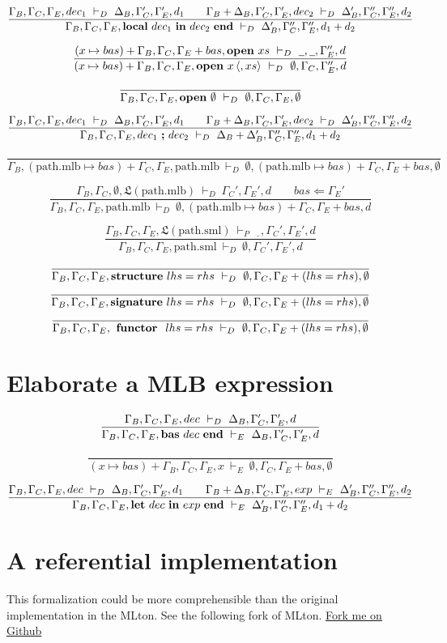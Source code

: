 \documentclass[11pt,a4paper]{article}
\newcommand{\keyword}[1]{\textrm{\textbf{#1}}}
\newcommand{\local}[2]{\keyword{local}\ #1\ \keyword{in}\ #2\ \keyword{end}}
\newcommand{\open}[1]{\keyword{open}\ #1}
\newcommand{\sequence}[2]{#1\ \keyword{;}\ #2}
\newcommand{\pathmlb}{\textrm{path.mlb}}
\newcommand{\pathsml}{\textrm{path.sml}}
\newcommand{\structure}{\keyword{structure}\ }
\newcommand{\signature}{\keyword{signature}\ }
\newcommand{\functor}  {\keyword{\ functor\ }\ }
\newcommand{\bas}[1]{\keyword{bas}\ #1\ \keyword{end}}
\newcommand{\lete}[2]{\keyword{let}\ #1\ \keyword{in}\ #2\ \keyword{end}}
\newcommand{\load}[1]{\mathfrak{L}(#1)}
\newcommand{\makebasis}[2]{ #1 \Leftarrow #2 }
\newcommand{\Binds}{\Gamma_B}
\newcommand{\BndAD}{\Delta_B}
\newcommand{\Cache}{\Gamma_C}
\newcommand{\Elabo}{\Gamma_E}
\newcommand{\Empty}{\emptyset}
\newcommand{\optional}[1]{\langle #1 \rangle}
\newcommand{\ElabDec}{\ \vdash_D\ }
\newcommand{\ElabExp}{\ \vdash_E\ }
\newcommand{\ElabProg}{\ \vdash_P\ }
\newcommand{\wildcard}{\underline{\phantom{2}}}
\begin{document}
\[
\dfrac{\Binds,\Cache,\Elabo,dec_1 \ElabDec \BndAD,\Cache',\Elabo',d_1 \qquad
       \Binds+\BndAD,\Cache',\Elabo',dec_2 \ElabDec \BndAD',\Cache'',\Elabo'',d_2}
      {\Binds,\Cache,\Elabo, \local{dec_1}{dec_2} \ElabDec \BndAD', \Cache'', \Elabo'', d_1+d_2}
\]

\[
\dfrac{(x\mapsto bas) + \Binds, \Cache, \Elabo + bas, \open{xs} \ElabDec \wildcard, \wildcard , \Elabo'', d}
      {(x\mapsto bas) + \Binds, \Cache, \Elabo, \open{x\,\optional{,xs}} \ElabDec \Empty, \Cache, \Elabo'', d}
\]

\[
\dfrac{ }
      { \Binds, \Cache, \Elabo, \open{\Empty} \ElabDec \Empty, \Cache, \Elabo, \Empty}
\]


\[
\dfrac{\Binds,\Cache,\Elabo,dec_1 \ElabDec \BndAD,\Cache',\Elabo',d_1 \qquad
       \Binds+\BndAD,\Cache',\Elabo',dec_2 \ElabDec \BndAD', \Cache'', \Elabo'', d_2}
      {\Binds,\Cache,\Elabo,\sequence{dec_1}{dec_2} \ElabDec \BndAD+\BndAD',\Cache'',\Elabo'',d_1+d_2}
\]

\[
\dfrac{}
      {\Binds, (\pathmlb \mapsto bas) + \Cache, \Elabo, \pathmlb \ElabDec \Empty, (\pathmlb \mapsto bas) + \Cache, \Elabo + bas, \Empty}
\]

\[
\dfrac{\Binds,\Cache,\Empty,\load{\pathmlb} \ElabDec \Cache',\Elabo',d \qquad
       \makebasis{bas}{\Elabo'}}
      {\Binds, \Cache, \Elabo, \pathmlb \ElabDec \Empty, (\pathmlb \mapsto bas) + \Cache, \Elabo + bas, d}
\]

\[
\dfrac{\Binds, \Cache, \Elabo, \load{\pathsml} \ElabProg \wildcard, \Cache', \Elabo', d
      }
      {\Binds, \Cache, \Elabo, \pathsml \ElabDec \Empty, \Cache', \Elabo', d}
\]

\[
\dfrac{}
      {\Binds,\Cache,\Elabo, \structure{lhs=rhs} \ElabDec \Empty,\Cache,\Elabo +(lhs=rhs),\Empty}
\]
\[
\dfrac{}
      {\Binds,\Cache,\Elabo, \signature{lhs=rhs} \ElabDec \Empty,\Cache,\Elabo +(lhs=rhs),\Empty}
\]
\[
\dfrac{}
      {\Binds,\Cache,\Elabo, \functor{lhs=rhs} \ElabDec \Empty,\Cache,\Elabo +(lhs=rhs),\Empty}
\]

\section{Elaborate a MLB expression}

\[
\dfrac{\Binds,\Cache,\Elabo,dec \ElabDec \BndAD, \Cache', \Elabo', d}
      {\Binds,\Cache,\Elabo,\bas{dec} \ElabExp \BndAD, \Cache', \Elabo', d}
\]

\[
\dfrac{}
      {(x \mapsto bas) + \Binds,\Cache,\Elabo,x \ElabExp \Empty, \Cache, \Elabo + bas, \Empty}
\]

\[
\dfrac{\Binds,\Cache,\Elabo,dec \ElabDec \BndAD, \Cache', \Elabo', d_1 \qquad
       \Binds+\BndAD,\Cache',\Elabo',exp \ElabExp \BndAD', \Cache'',\Elabo'', d_2}
      {\Binds,\Cache,\Elabo,\lete{dec}{exp} \ElabExp \BndAD', \Cache'', \Elabo'', d_1 + d_2}
\]

\section {A referential implementation}
This formalization could be more comprehensible than the original implementation in the MLton. See the following fork of
MLton.
\href{https://github.com/pierric/mlton}{Fork me on Github}
\end{document}
